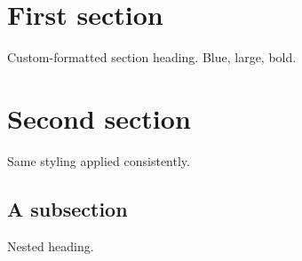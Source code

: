 \documentclass{article}
\begin{document}
\section{First section}
Custom-formatted section heading. Blue, large, bold.

\section{Second section}
Same styling applied consistently.

\subsection{A subsection}
Nested heading.
\end{document}
